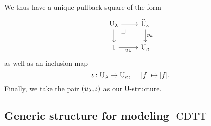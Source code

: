 \documentclass[10pt,letterpaper,cm]{nupset}
\theoremstyle{definition}
\theoremstyle{theorem}
\theoremstyle{remark}
\newcommand{\U}{\mathsf{U}}
\newcommand{\0}{\mathbf{0}}
\newcommand{\1}{\mathbf{1}}
\newcommand{\2}{\mathbf{2}}
\DeclareMathOperator{\cdtt}{\mathrm{CDTT}}
\begin{document}
\smallskip

We thus have a unique pullback square of the form
\[
\begin{tikzcd}
\mathrm{U}_{\lambda} \arrow[r] \arrow[d] 
\arrow[dr, phantom, "\scalebox{1.5}{\color{black}$\lrcorner$}" , very near start, color=black]
& \widehat{\mathrm{U}}_{\kappa} \arrow[d, "p_{\kappa}"] \\
1 \arrow[r, "u_{\lambda}"']                              & \mathrm{U}_{\kappa}                    
\end{tikzcd}
\] as well as an inclusion map 
\[
\iota : \mathrm{U}_{\lambda} \to \mathrm{U}_{\kappa}, \ \quad \mleft[f\mright] \mapsto \mleft[f\mright]
.\] Finally, we take the pair $\mleft(u_{\lambda}, \iota\mright)$ as  our $\U$-structure.

\subsection*{Generic structure for modeling $\cdtt$}
\end{document}
